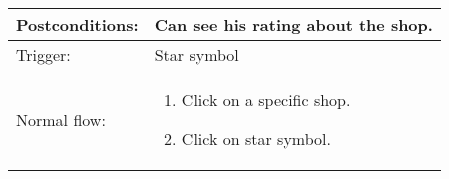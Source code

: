 \begin{longtable}{| p{3.5cm} | p{9cm} |}
\hline
Postconditions: & Can see his rating about the shop. \\
\hline
Trigger: & Star symbol\\
\hline
Normal flow: &\mbox{}\par\vspace{-\baselineskip}
\begin{enumerate}
\item Click on a specific shop.
\item Click on star symbol.
\end{enumerate}\\
\hline
\end{longtable}

